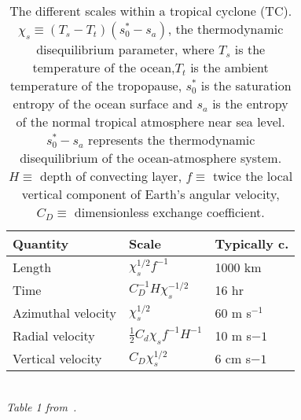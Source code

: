 
\begin{table}[h!]
\centering
\begin{tabular}{lll}
\hline \hline
\textbf{Quantity} & \textbf{Scale} & \textbf{Typically c.}\\
\hline
Length & $\chi_s^{1/2}f^{-1}$ & 1000 km \\
Time & $C_D^{-1}H\chi_{s}^{-1/2}$ & 16 hr \\
Azimuthal velocity & $\chi_s^{1/2}$ & 60 m s$^{-1}$\\
Radial velocity & $\frac{1}{2}C_d\chi_s f^{-1}H^{-1}$ & 10 m s$-1$\\
Vertical velocity & $C_D \chi_s^{1/2}$ & 6 cm s$-1$\\
\hline \hline
\end{tabular}\\
\textit{Table 1 from~\cite{emanuel1991theory}.}
\caption{The different scales within a tropical cyclone (TC).
$\chi_s\equiv(T_s-T_t)(s_{0}^{*}-s_a)$, the thermodynamic disequilibrium parameter,
 where $T_s$ is the temperature
of the ocean,$T_t$ is the ambient temperature of the tropopause,
$s_{0}^{*}$ is the saturation entropy of the ocean surface and
$s_a$ is the entropy of the normal tropical atmosphere near sea level.
$s_{0}^{*}-s_a$ represents the thermodynamic disequilibrium of the ocean-atmosphere
system. $H\equiv$ depth of convecting layer, $f\equiv$ twice the
local vertical component of Earth's angular velocity, $C_D\equiv$
dimensionless exchange coefficient.}

\label{tab:hurr-scales}
\end{table}
